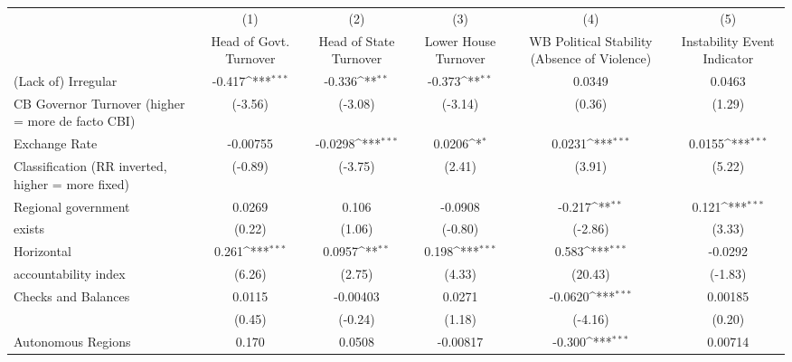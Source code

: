 {
\def\sym#1{\ifmmode^{#1}\else\(^{#1}\)\fi}
\begin{tabular}{l*{5}{c}}
\hline\hline
                    &\multicolumn{1}{c}{(1)}&\multicolumn{1}{c}{(2)}&\multicolumn{1}{c}{(3)}&\multicolumn{1}{c}{(4)}&\multicolumn{1}{c}{(5)}\\
                    &\multicolumn{1}{c}{Head of Govt. Turnover}&\multicolumn{1}{c}{Head of State Turnover}&\multicolumn{1}{c}{Lower House Turnover}&\multicolumn{1}{c}{WB Political Stability (Absence of Violence)}&\multicolumn{1}{c}{Instability Event Indicator}\\
\hline
(Lack of) Irregular &      -0.417\sym{***}&      -0.336\sym{**} &      -0.373\sym{**} &      0.0349         &      0.0463         \\
CB Governor Turnover (higher = more de facto CBI)&     (-3.56)         &     (-3.08)         &     (-3.14)         &      (0.36)         &      (1.29)         \\
[1em]
Exchange Rate       &    -0.00755         &     -0.0298\sym{***}&      0.0206\sym{*}  &      0.0231\sym{***}&      0.0155\sym{***}\\
Classification (RR inverted, higher = more fixed)&     (-0.89)         &     (-3.75)         &      (2.41)         &      (3.91)         &      (5.22)         \\
[1em]
Regional government &      0.0269         &       0.106         &     -0.0908         &      -0.217\sym{**} &       0.121\sym{***}\\
exists              &      (0.22)         &      (1.06)         &     (-0.80)         &     (-2.86)         &      (3.33)         \\
[1em]
Horizontal          &       0.261\sym{***}&      0.0957\sym{**} &       0.198\sym{***}&       0.583\sym{***}&     -0.0292         \\
accountability index&      (6.26)         &      (2.75)         &      (4.33)         &     (20.43)         &     (-1.83)         \\
[1em]
Checks and Balances &      0.0115         &    -0.00403         &      0.0271         &     -0.0620\sym{***}&     0.00185         \\
                    &      (0.45)         &     (-0.24)         &      (1.18)         &     (-4.16)         &      (0.20)         \\
[1em]
Autonomous Regions  &       0.170         &      0.0508         &    -0.00817         &      -0.300\sym{***}&     0.00714         \\

\end{tabular}}

